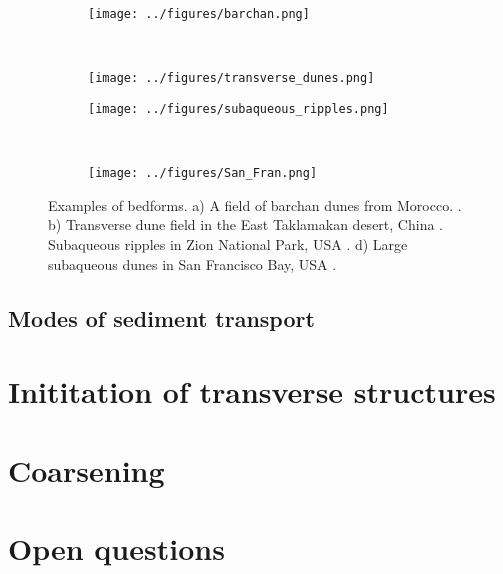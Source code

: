 \documentclass[12pt]{article}
\begin{document}
\begin{figure}
    \centering
    \begin{subfigure}[b]{0.45\textwidth}
        \texttt{[image: ../figures/barchan.png]}
        \caption{}
        \label{fig:barchan}
    \end{subfigure}
    ~ %
    \begin{subfigure}[b]{0.45\textwidth}
        \texttt{[image: ../figures/transverse\_dunes.png]}
        \caption{}
        \label{fig:trans}
    \end{subfigure}

    \begin{subfigure}[b]{0.45\textwidth}
        \texttt{[image: ../figures/subaqueous\_ripples.png]}
        \caption{}
        \label{fig:subaq_rip}
    \end{subfigure}
    ~ %
    \begin{subfigure}[b]{0.45\textwidth}
        \texttt{[image: ../figures/San\_Fran.png]}
        \caption{}
        \label{fig:SF}
    \end{subfigure}

    \caption{Examples of bedforms. a) A field of barchan dunes from Morocco. \citep{Duran11}. b) Transverse dune field in the East Taklamakan desert, China \citep{Gao15}. Subaqueous ripples in Zion National Park, USA \citep{Andreotti12}. d) Large subaqueous dunes in San Francisco Bay, USA \citep{Barnard06}.\label{fig:bedforms}}
\end{figure}

\subsection{Modes of sediment transport}
\label{subsec:sed_trans}

\section{Inititation of transverse structures}
\label{sec:init}

\section{Coarsening}
\label{sec:coarse}

\section{Open questions}
\label{sec:openQs}





\end{document}
